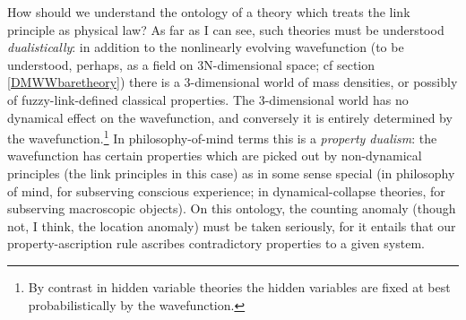 \documentclass[12pt]{article}
\begin{document}
How should we understand the ontology of a theory which treats the link principle as physical law? As far as I can see, such theories must be understood \emph{dualistically}: in addition to the nonlinearly evolving wavefunction (to be understood, perhaps, as a field on 3N-dimensional space; cf section \ref{DMWWbaretheory}) there is a 3-dimensional world of mass densities, or possibly of fuzzy-link-defined classical properties. The 3-dimensional world has no dynamical effect on the wavefunction, and conversely it is entirely determined by the wavefunction.\footnote{By contrast in hidden variable theories the hidden variables are fixed at best probabilistically by the wavefunction.} In philosophy-of-mind terms this is a \emph{property dualism}: the wavefunction has certain properties which are picked out by non-dynamical principles (the link principles in this case) as in some sense special (in philosophy of mind, for subserving conscious experience; in dynamical-collapse theories, for subserving macroscopic objects). On this ontology, the counting anomaly (though not, I think, the location anomaly) must  be taken seriously, for it entails that our property-ascription rule ascribes contradictory properties to a given system.
\end{document}
